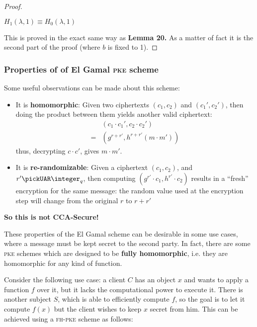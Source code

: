 \begin{proof}
    \begin{lemma}
        $H_1(\lambda,1)\equiv H_0(\lambda,1)$
    \end{lemma}
    This is proved in the exact same way as \textbf{Lemma 20.} As a matter of fact it is the second part of the proof (where $b$ is fixed to 1).
    
\end{proof}

\subsubsection{Properties of of El Gamal \textsc{pke} scheme}

Some useful observations can be made about this scheme:
\begin{itemize}
    \item It is \textbf{homomorphic}: Given two ciphertexts $(c_1, c_2)$ and $(c_1', c_2')$, then doing the product between them yields another valid ciphertext:
    \begin{align*}
        & (c_1\cdot c_1', c_2\cdot c_2') \\
        =& (g^{r+r'}, h^{r+r'}(m\cdot m'))
    \end{align*}
    thus, decrypting $c\cdot c'$, gives $m\cdot m'$.
    
    \item It is \textbf{re-randomizable}: Given a ciphertext $(c_1, c_2)$, and $r' \pickUAR \integer_q$, then computing $(g^{r'}\cdot c_1, h^{r'}\cdot c_2)$ results in a ``fresh'' encryption for the same message: the random value used at the encryption step will change from the original $r$ to $r+r'$
\end{itemize}
\textbf{So this is not CCA-Secure!}

These properties of the El Gamal scheme can be desirable in some use cases, where a message must be kept secret to the second party. In fact, there are some \textsc{pke} schemes which are designed to be \textbf{fully homomorphic}, i.e. they are homomorphic for any kind of function.

Consider the following use case: a client $C$ has an object $x$ and wants to apply a function $f$ over it, but it lacks the computational power to execute it. There is another subject $S$, which is able to efficiently compute $f$, so the goal is to let it compute $f(x)$ but the client wishes to keep $x$ secret from him. This can be achieved using a \textsc{fh-pke} scheme as follows:

